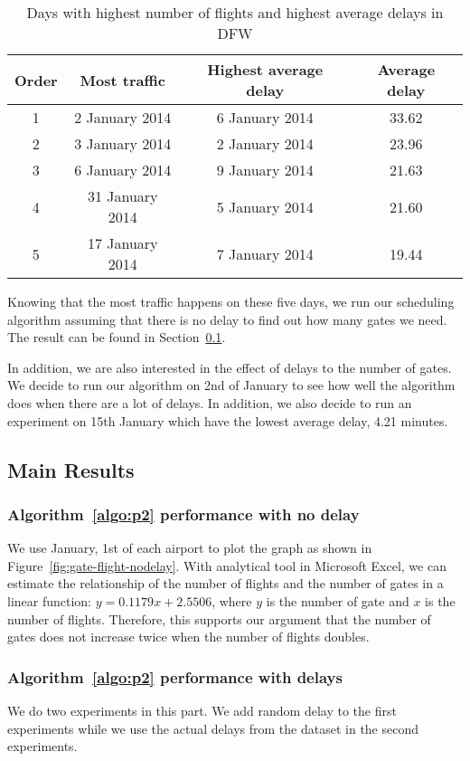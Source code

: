 \documentclass[11pt,a4paper]{article}
\begin{document}
\begin{table}
\caption{Days with highest number of flights and highest average delays in DFW}
\centering
\begin{tabular}{| c | c | c | c |}
\hline
Order & Most traffic & Highest average delay & Average delay \\
\hline
1 & 2 January 2014 & 6 January 2014 & 33.62\\
2 & 3 January 2014 & 2 January 2014 & 23.96\\
3 & 6 January 2014 & 9 January 2014 & 21.63\\
4 & 31 January 2014 & 5 January 2014 & 21.60\\
5 & 17 January 2014 & 7 January 2014 & 19.44\\
\hline
\end{tabular}
\label{table:airport-dfw-delay}
\end{table}

Knowing that the most traffic happens on these five days, we run our scheduling algorithm assuming that there is no delay to find out how many gates we need. The result can be found in Section~\ref{subsec:expo-resu}. \par 
In addition, we are also interested in the effect of delays to the number of gates. We decide to run our algorithm on 2nd of January to see how well the algorithm does when there are a lot of delays. In addition, we also decide to run an experiment on 15th January which have the lowest average delay, 4.21 minutes.

\subsection{Main Results}
\label{subsec:expo-resu}
\subsubsection{Algorithm~\ref{algo:p2} performance with no delay} We use January, 1st of each airport to plot the graph as shown in Figure~\ref{fig:gate-flight-nodelay}. With analytical tool in Microsoft Excel, we can estimate the relationship of the number of flights and the number of gates in a linear function: $y = 0.1179x + 2.5506$, where $y$ is the number of gate and $x$ is the number of flights. Therefore, this supports our argument that the number of gates does not increase twice when the number of flights doubles.

\subsubsection{Algorithm~\ref{algo:p2} performance with delays} We do two experiments in this part. We add random delay to the first experiments while we use the actual delays from the dataset in the second experiments.
\end{document}

